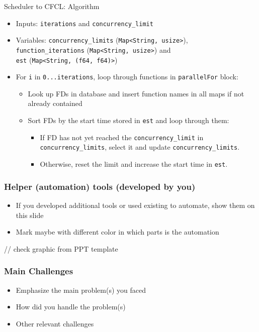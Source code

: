 \documentclass[11pt,t,usepdftitle=false,aspectratio=169]{beamer}
\begin{document}
\begin{frame}{Scheduler to CFCL: Algorithm}
  \begin{itemize}
    \item Inputs: \texttt{iterations} and \texttt{concurrency\_limit}
    \item Variables: \texttt{concurrency\_limits} (\texttt{Map<String, usize>}), \\ \texttt{function\_iterations} (\texttt{Map<String, usize>}) and \\ \texttt{est} (\texttt{Map<String, (f64, f64)>})
    \item For \texttt{i} in \texttt{0...iterations}, loop through functions in \texttt{parallelFor} block:
      \begin{itemize}
        \item Look up FDs in database and insert function names in all maps if not already contained
        \item Sort FDs by the start time stored in \texttt{est} and loop through them:
          \begin{itemize}
            \item If FD has not yet reached the \texttt{concurrency\_limit} in \texttt{concurrency\_limits}, select it and update \texttt{concurrency\_limits}.
            \item Otherwise, reset the limit and increase the start time in \texttt{est}.
          \end{itemize}
    \end{itemize}
  \end{itemize}
\end{frame}

\begin{frame}
\frametitle{Helper (automation) tools (developed by you)}
    \begin{itemize}
        \item If you developed additional tools or used existing to automate, show them on this slide
        \item Mark maybe with different color in which parts is the automation
    \end{itemize}
    \vspace{1cm}
    // check graphic from PPT template
\end{frame}

\begin{frame}
\frametitle{Main Challenges}
    \begin{itemize}
        \item Emphasize the main problem(s) you faced
        \item How did you handle the problem(s)
        \item Other relevant challenges
    \end{itemize}
\end{frame}
\end{document}
